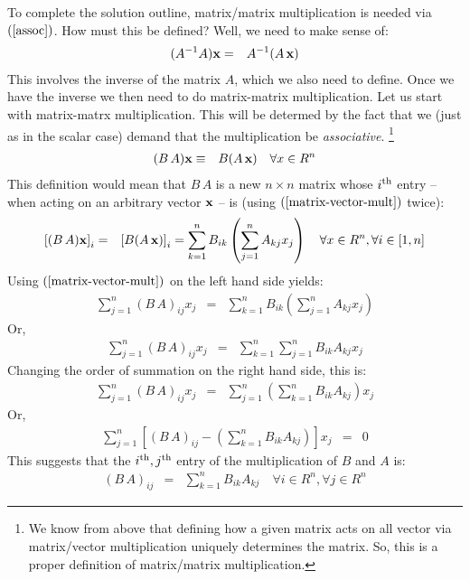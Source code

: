 \documentclass{article}
\begin{document}
To complete the solution outline, matrix/matrix multiplication is needed
via $(\ref{assoc})$. How must this be defined?
Well, we need to make sense of:
\begin{eqnarray}
  (A^{-1} A) {\bf x} & = & A^{-1} (A \, {\bf x}) 
\end{eqnarray}
This involves the inverse of the matrix $A$, which we also need to define. Once
we have the inverse we then need to do matrix-matrix multiplication.
Let us start with matrix-matrx multiplication.
This will be determed by the fact that we (just as in the scalar case) demand that the multiplication
be {\em associative\/}.
\footnote{We know from above that defining how a given matrix acts on all vector
  via matrix/vector multiplication uniquely determines the matrix. So, this is a proper definition of matrix/matrix multiplication.}
\begin{eqnarray}
    (B \, A) {\bf x} & \equiv & B (A \, {\bf x}) \quad \forall x \in R^n
\end{eqnarray}
This definition would mean that $B \, A$ is a new $n \times n$ matrix whose
$i^{\rm th}$ entry -- when acting on an arbitrary vector ${\bf x}$ --
is (using $(\ref{matrix-vector-mult})$ twice):
\begin{eqnarray}
    \left[(B \, A) {\bf x}\right]_i &  = & \left[B (A \, {\bf x})\right]_i = \sum_{k=1}^n B_{ik} \left(\sum_{j=1}^n A_{kj} x_j\right) \quad \forall x \in R^n, \forall i \in [1,n]
\end{eqnarray}
Using $(\ref{matrix-vector-mult})$ on the left hand side yields:
\begin{eqnarray}
  \sum_{j=1}^n (B \, A)_{ij} x_j &  = & \sum_{k=1}^n B_{ik} \left(\sum_{j=1}^n A_{kj} x_j\right)
\end{eqnarray}
Or,
\begin{eqnarray}
  \sum_{j=1}^n (B \, A)_{ij} x_j &  = & \sum_{k=1}^n \sum_{j=1}^n B_{ik} A_{kj} x_j
\end{eqnarray}
Changing the order of summation on the right hand side, this is:
\begin{eqnarray}
  \sum_{j=1}^n (B \, A)_{ij} x_j &  = & \sum_{j=1}^n \left(\sum_{k=1}^n B_{ik} A_{kj}\right) x_j \label{matrix-matrix-deriv}
\end{eqnarray}
Or,
\begin{eqnarray}
    \sum_{j=1}^n \left[ (B \, A)_{ij} - \left(\sum_{k=1}^n B_{ik} A_{kj}\right)\right] x_j & = & 0\label{matrix-matrix-deriv-2}
\end{eqnarray}
This suggests that the $i^{\rm th}, j^{\rm th}$ entry of the multiplication of $B$ and $A$ is:
\begin{eqnarray}
    (B \, A)_{ij} & = & \sum_{k=1}^n B_{ik} A_{kj} \label{matrix-matrix-mult} \quad \forall i \in R^n, \forall j \in R^n
\end{eqnarray}
\end{document}
